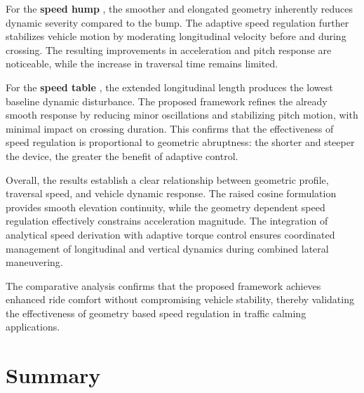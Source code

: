 \documentclass[a4paper,12pt,one side]{report}
\theoremstyle{definition}
\begin{document}
\begin{itemize}
For the \textbf{speed hump} \cite{yeo2020effects}, the smoother and elongated geometry inherently reduces dynamic severity compared to the bump. The adaptive speed regulation further stabilizes vehicle motion by moderating longitudinal velocity before and during crossing. The resulting improvements in acceleration and pitch response are noticeable, while the increase in traversal time remains limited.

For the \textbf{speed table} \cite{moreno2011speed}, the extended longitudinal length produces the lowest baseline dynamic disturbance. The proposed framework refines the already smooth response by reducing minor oscillations and stabilizing pitch motion, with minimal impact on crossing duration. This confirms that the effectiveness of speed regulation is proportional to geometric abruptness: the shorter and steeper the device, the greater the benefit of adaptive control.

Overall, the results establish a clear relationship between geometric profile, traversal speed, and vehicle dynamic response. The raised cosine formulation provides smooth elevation continuity, while the geometry dependent speed regulation effectively constrains acceleration magnitude. The integration of analytical speed derivation with adaptive torque control ensures coordinated management of longitudinal and vertical dynamics during combined lateral maneuvering.

The comparative analysis confirms that the proposed framework achieves enhanced ride comfort without compromising vehicle stability, thereby validating the effectiveness of geometry based speed regulation in traffic calming applications.

\section{ Summary}


\end{itemize}
\end{document}
